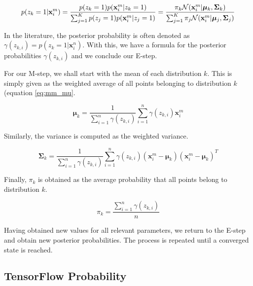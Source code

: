 \begin{equation}
    p(z_k=1|\textbf{x}_i^m) = \frac{p(z_k=1) p(\textbf{x}_i^m|z_k=1)}{\sum^K_{j=1}p(z_j=1)p(\textbf{x}_i^m|z_j=1)}\\
    = \frac{\pi_k\mathcal{N}(\textbf{x}_i^m|\bm{\mu}_k, \bm{\Sigma}_k)}{\sum_{j=1}^K\pi_j\mathcal{N}(\textbf{x}_i^m|\bm{\mu}_j, \bm{\Sigma}_j)} 
\end{equation}

In the literature, the posterior probability is often denoted as $\gamma(z_{k,i}) = p(z_k=1|\bm{x}_i^n)$. With this, we have a formula for the posterior probabilities $\gamma(z_{k,i})$ and we conclude our E-step.

For our M-step, we shall start with the mean of each distribution $k$. This is simply given as the weighted average of all points belonging to distribution $k$ (equation \ref{eq:mm_mu}.

\begin{equation}\label{eq:mm_mu}
    \bm{\mu}_k = \frac{1}{\sum^n_{i=1} \gamma(z_{k,i})} \sum^n_{i=1} \gamma(z_{k,i}) \textbf{x}^m_i
\end{equation}

Similarly, the variance is computed as the weighted variance.

\begin{equation}\label{eq:mm_var}
    \bm{\Sigma}_k = \frac{1}{\sum^n_{i=1} \gamma(z_{k,i})} \sum^n_{i=1} \gamma(z_{k,i}) (\textbf{x}^m_i-\bm{\mu}_k)(\textbf{x}^m_i-\bm{\mu}_k)^T
\end{equation}

Finally, $\pi_k$ is obtained as the average probability that all points belong to distribution $k$.

\begin{equation}\label{eq:mm_mix}
    \pi_k = \frac{\sum^n_{i=1}{} \gamma(z_{k,i})}{n}
\end{equation}

Having obtained new values for all relevant parameters, we return to the E-step and obtain new posterior probabilities. The process is repeated until a converged state is reached.


\subsection{TensorFlow Probability}
 
 
